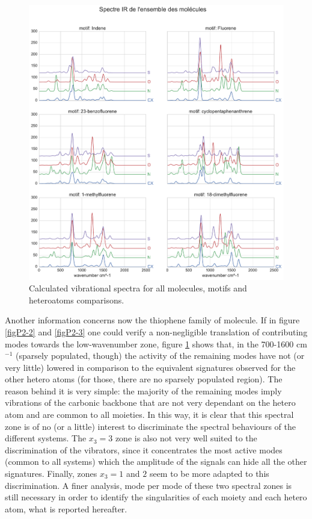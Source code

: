 	
	\begin{figure}[H]
		\begin{center}
			\includegraphics[scale=0.46]{image/P2-4}
		\end{center}
		\caption{Calculated vibrational spectra for all molecules, motifs and heteroatoms comparisons. }  \label{figP2-4}
	\end{figure}
	
Another information concerns now the thiophene family of molecule. If in figure \ref{figP2-2} and \ref{figP2-3} one could verify a non-negligible translation of contributing modes towards the low-wavenumber zone, figure \ref{figP2-4} shows that, in the 700-1600 cm$^{-1}$ (sparsely populated, though) the activity of the remaining modes have not (or very little) lowered in comparison to the equivalent signatures observed for the other hetero atoms (for those, there are no sparsely populated region). The reason behind it is very simple: the majority of the remaining modes imply vibrations of the carbonic backbone that are not very dependant on the hetero atom and are common to all moieties. In this way, it is clear that this spectral zone is of no (or a little) interest to discriminate the spectral behaviours of the different systems. The $x_3=3$ zone is also not very well suited to the discrimination of the vibrators, since it concentrates the most active modes (common to all systems) which the amplitude of the signals can hide all the other signatures. Finally, zones $x_3=1$ and $2$ seem to be more adapted to this discrimination. A finer analysis, mode per mode of these two spectral zones is still necessary in order to identify the singularities of each moiety and each hetero atom, what is reported hereafter.

